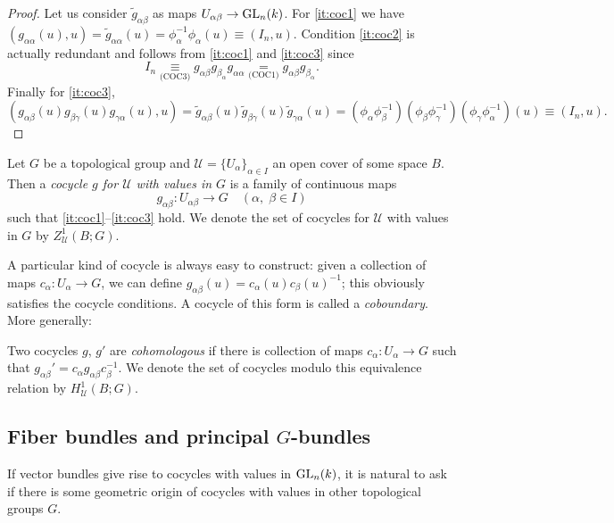 \documentclass[a4paper,openany]{scrbook}
\begin{document}
\begin{proof}
  Let us consider $\tilde g_{\alpha\beta}$ as maps $U_{\alpha\beta} \to \operatorname{GL}_n(k)$. For \ref{it:coc1} we have $(g_{\alpha\alpha}(u),u) = \tilde g_{\alpha\alpha}(u) =  \phi_\alpha^{-1} \phi_\alpha(u) \equiv (I_n,u)$.
Condition \ref{it:coc2} is actually redundant and follows from \ref{it:coc1} and \ref{it:coc3} since
\[
I_n \underset{\text{(COC3)}}\equiv g_{\alpha\beta} g_{\beta_\alpha} g_{\alpha\alpha} \underset{\text{(COC1)}} = g_{\alpha\beta} g_{\beta_\alpha}.
\]
 Finally for \ref{it:coc3},
\[
  (g_{\alpha\beta}(u) g_{\beta \gamma}(u) g_{\gamma\alpha}(u),u) = \tilde g_{\alpha\beta}(u) \tilde g_{\beta \gamma}(u) \tilde g_{\gamma\alpha}(u) = (\phi_\alpha \phi_\beta^{-1})(\phi_\beta\phi_\gamma^{-1})(\phi_\gamma\phi_\alpha^{-1})(u) \equiv (I_n,u).
\]
\end{proof}


\begin{defn}
Let $G$ be a topological group and $\mathcal U = \{U_\alpha\}_{\alpha \in I}$ an open cover of some space $B$. Then a \emph{cocycle $g$ for $\mathcal U$ with values in $G$} is a family of continuous maps
\[
g_{\alpha\beta}\colon U_{\alpha\beta} \to G \quad (\alpha,\;\beta \in I)
\]
such that \ref{it:coc1}--\ref{it:coc3} hold. We denote the set of cocycles for $\mathcal U$ with values in $G$ by $Z^1_{\mathcal U}(B;G)$.
\end{defn}


A particular kind of cocycle is always easy to construct: given a collection of maps $c_\alpha\colon U_\alpha \to G$, we can define $g_{\alpha\beta}(u) = c_\alpha(u)c_\beta(u)^{-1}$; this obviously satisfies the cocycle conditions. A cocycle of this form is called a \emph{coboundary}. More generally:

\begin{defn} Two cocycles $g$, $g'$ are \emph{cohomologous} if there is collection of maps $c_\alpha\colon U_{\alpha} \to G$ such that $g_{\alpha\beta}' = c_\alpha g_{\alpha\beta} c_\beta^{-1}$. We denote the set of cocycles modulo this equivalence relation by $H^1_{\mathcal U}(B;G)$.
\end{defn}

\subsection{Fiber bundles and principal $G$-bundles}

If vector bundles give rise to cocycles with values in $\operatorname{GL}_n(k)$, it is natural to ask if there is some geometric origin of cocycles with values in other topological groups $G$.
\end{document}
